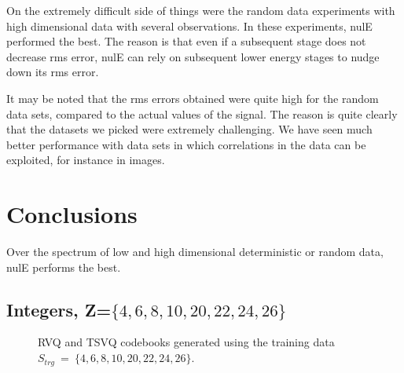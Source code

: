 On the extremely difficult side of things were the random data experiments with high dimensional data with several observations.  In these experiments, nulE performed the best.  The reason is that even if a subsequent stage does not decrease rms error, nulE can rely on subsequent lower energy stages to nudge down its rms error.  


It may be noted that the rms errors obtained were quite high for the random data sets, compared to the actual values of the signal.  The reason is quite clearly that the datasets we picked were extremely challenging.  We have seen much better performance with data sets in which correlations in the data can be exploited, for instance in images.

\section{Conclusions}
Over the spectrum of low and high dimensional deterministic or random data, nulE performs the best.





\clearpage
\newpage
\subsection{Integers, Z=$\{4, 6, 8, 10, 20, 22, 24, 26\}$}
								\begin{figure}[h!]
								\centering
								\caption{RVQ and TSVQ codebooks generated using the training data $S_{trg}~=~\{4, 6, 8, 10, 20, 22, 24, 26\}$.}
								\end{figure}
															



